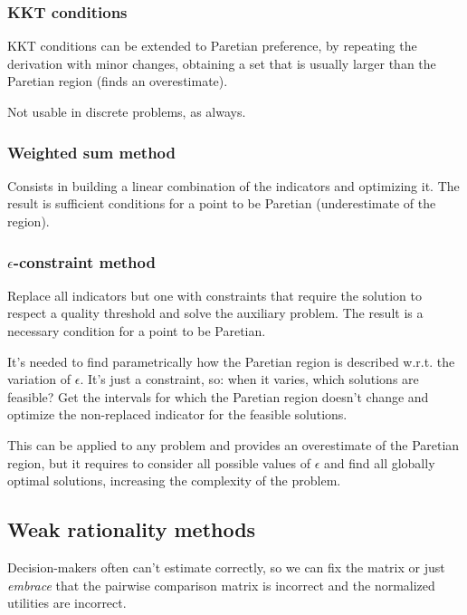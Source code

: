 \subsubsection{KKT conditions}

KKT conditions can be extended to Paretian preference, by repeating the derivation with minor changes, obtaining a set that is usually larger than the Paretian region (finds an overestimate).

Not usable in discrete problems, as always.  

\subsubsection{Weighted sum method}

Consists in building a linear combination of the indicators and optimizing it. The result is sufficient conditions for a point to be Paretian (underestimate of the region).


\subsubsection{$\epsilon$-constraint method}

Replace all indicators but one with constraints that require the solution to respect a quality threshold and solve the auxiliary problem. The result is a necessary condition for a point to be Paretian.

It's needed to find parametrically how the Paretian region is described w.r.t. the variation of $\epsilon$. It's just a constraint, so: when it varies, which solutions are feasible? Get the intervals for which the Paretian region doesn't change and optimize the non-replaced indicator for the feasible solutions.

This can be applied to any problem and provides an overestimate of the Paretian region, but it requires to consider all possible values of $\epsilon$ and find all globally optimal solutions, increasing the complexity of the problem. 

\subsection{Weak rationality methods}

Decision-makers often can't estimate correctly, so we can fix the matrix or just \textit{embrace} that the pairwise comparison matrix is incorrect and the normalized utilities are incorrect.

